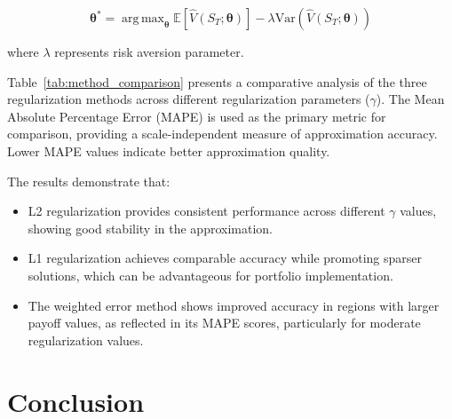 \documentclass[12pt]{article}
\DeclareMathOperator*{\argmax}{arg\,max}
\begin{document}
\begin{equation}
\boldsymbol{\theta}^* = 
    \argmax_{\boldsymbol{\theta}} 
        \mathbb{E}\left[\hat{V}(S_T;\boldsymbol{\theta})\right] - 
        \lambda \text{Var}\left(\hat{V}(S_T;\boldsymbol{\theta})\right)
\end{equation}

where $\lambda$ represents risk aversion parameter.



Table~\ref{tab:method_comparison} presents a comparative analysis of the three regularization 
methods across different regularization parameters ($\gamma$). The Mean Absolute Percentage 
Error (MAPE) is used as the primary metric for comparison, providing a scale-independent 
measure of approximation accuracy. Lower MAPE values indicate better approximation quality.

The results demonstrate that:
\begin{itemize}
    \item L2 regularization provides consistent performance across different $\gamma$ values,
    showing good stability in the approximation.
    \item L1 regularization achieves comparable accuracy while promoting sparser solutions,
    which can be advantageous for portfolio implementation.
    \item The weighted error method shows improved accuracy in regions with larger payoff
    values, as reflected in its MAPE scores, particularly for moderate regularization values.
\end{itemize}

\section{Conclusion}



\end{document}
